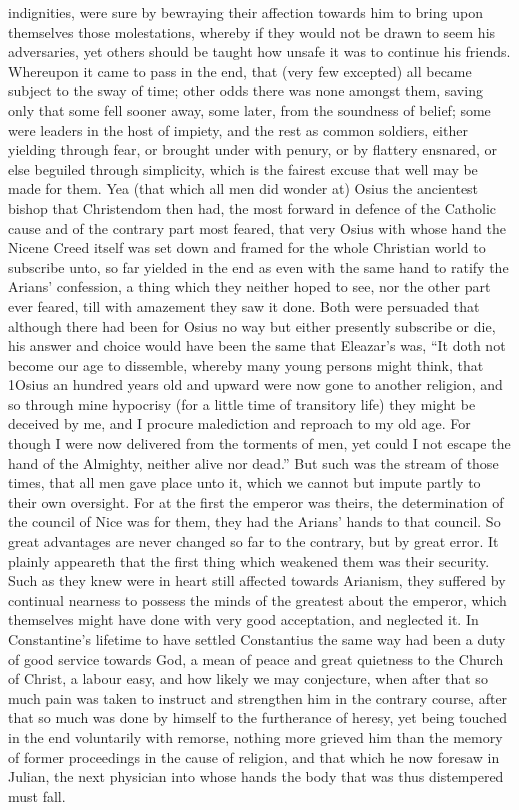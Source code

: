 indignities, were sure by bewraying their affection towards him to bring upon themselves those molestations, whereby if they would not be drawn to seem his adversaries, yet others should be taught how unsafe it was to continue his friends.
Whereupon it came to pass in the end, that (very few excepted) all became subject to the sway of time; other odds there was none amongst them, saving only that some fell sooner away, some later, from the soundness of belief; some were leaders in the host of impiety, and the rest as common soldiers, either yielding through fear, or brought under with penury, or by flattery ensnared, or else beguiled through simplicity, which is the fairest excuse that well may be made for them. Yea (that which all men did wonder at) Osius the ancientest bishop that Christendom then had, the most forward in defence of the Catholic cause and of the contrary part most feared, that very Osius with whose hand the Nicene Creed itself was set down and framed for the whole Christian world to subscribe unto, so far yielded in the end as even with the same hand to ratify the Arians’ confession, a thing which they neither hoped to see, nor the other part ever feared, till with amazement they saw it done. Both were persuaded that although there had been for Osius no way but either presently subscribe or die, his answer and choice would have been the same that Eleazar’s was, “It doth not become our age to dissemble, whereby many young persons might think,  that 1Osius an hundred years old and upward were now gone to another religion, and so through mine hypocrisy (for a little time of transitory life) they might be deceived by me, and I procure malediction and reproach to my old age. For though I were now delivered from the torments of men, yet could I not escape the hand of the Almighty, neither alive nor dead.” But such was the stream of those times, that all men gave place unto it, which we cannot but impute partly to their own oversight. For at the first the emperor was theirs, the determination of the council of Nice was for them, they had the Arians’ hands to that council. So great advantages are never changed so far to the contrary, but by great error.
It plainly appeareth that the first thing which weakened them was their security. Such as they knew were in heart still affected towards Arianism, they suffered by continual nearness to possess the minds of the greatest about the emperor, which themselves might have done with very good acceptation, and neglected it. In Constantine’s lifetime to have settled Constantius the same way had been a duty of good service towards God, a mean of peace and great quietness to the Church of Christ, a labour easy, and how likely we may conjecture, when after that so much pain was taken to instruct and strengthen him in the contrary course, after that so much was done by himself to the furtherance of heresy, yet being touched in the end voluntarily with remorse, nothing more grieved him than the memory of former proceedings in the cause of religion, and that which he now foresaw in Julian, the next physician into whose hands the body that was thus distempered must fall.
